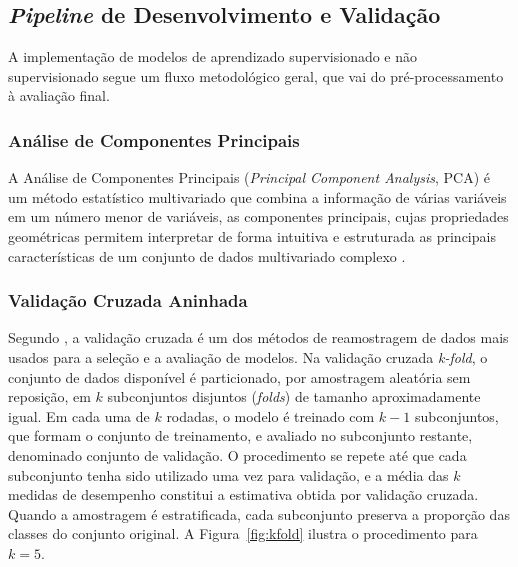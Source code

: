 \documentclass{uflamon}          %
\begin{document}
\subsection{\texorpdfstring{\textit{Pipeline}}{Pipeline} de Desenvolvimento e Validação}

A implementação de modelos de aprendizado supervisionado e não supervisionado segue um fluxo metodológico geral, que vai do pré-processamento à avaliação final.

\subsubsection{Análise de Componentes Principais}

A Análise de Componentes Principais (\textit{Principal Component Analysis}, PCA) é um método estatístico multivariado que combina a informação de várias variáveis em um número menor de variáveis, as componentes principais, cujas propriedades geométricas permitem interpretar de forma intuitiva e estruturada as principais características de um conjunto de dados multivariado complexo \cite{greenacre2022}.

\subsubsection{Validação Cruzada Aninhada}
\label{sec:nested}

Segundo , a validação cruzada é um dos métodos de reamostragem de dados mais usados para a seleção e a avaliação de modelos. Na validação cruzada \textit{k-fold}, o conjunto de dados disponível é particionado, por amostragem aleatória sem reposição, em $k$ subconjuntos disjuntos (\textit{folds}) de tamanho aproximadamente igual. Em cada uma de $k$ rodadas, o modelo é treinado com $k-1$ subconjuntos, que formam o conjunto de treinamento, e avaliado no subconjunto restante, denominado conjunto de validação. O procedimento se repete até que cada subconjunto tenha sido utilizado uma vez para validação, e a média das $k$ medidas de desempenho constitui a estimativa obtida por validação cruzada. Quando a amostragem é estratificada, cada subconjunto preserva a proporção das classes do conjunto original. A Figura~\ref{fig:kfold} ilustra o procedimento para $k = 5$.
\end{document}
